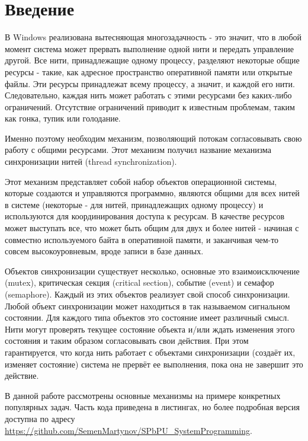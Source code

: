 \documentclass[a4paper, 12pt]{article}		%
\begin{document}
\newpage
\section*{Введение}

В Windows реализована вытесняющая многозадачность - это значит, что в любой момент система может прервать выполнение одной нити и передать управление другой. Все нити, принадлежащие одному процессу, разделяют некоторые общие ресурсы - такие, как адресное пространство оперативной памяти или открытые файлы. Эти ресурсы принадлежат всему процессу, а значит, и каждой его нити. Следовательно, каждая нить может работать с этими ресурсами без каких-либо ограничений. Отсутствие ограничений приводит к известным проблемам, таким как гонка, тупик или голодание.

Именно поэтому необходим механизм, позволяющий потокам согласовывать свою работу с общими ресурсами. Этот механизм получил название механизма синхронизации нитей (thread synchronization).

Этот механизм представляет собой набор объектов операционной системы, которые создаются и управляются программно, являются общими для всех нитей в системе (некоторые - для нитей, принадлежащих одному процессу) и используются для координирования доступа к ресурсам. В качестве ресурсов может выступать все, что может быть общим для двух и более нитей - начиная с совместно используемого байта в оперативной памяти, и заканчивая чем-то совсем высокоуровневым, вроде записи в базе данных.

Объектов синхронизации существует несколько, основные это взаимоисключение (mutex), критическая секция (critical section), событие (event) и семафор (semaphore). Каждый из этих объектов реализует свой способ синхронизации. Любой объект синхронизации может находиться в так называемом сигнальном состоянии. Для каждого типа объектов это состояние имеет различный смысл. Нити могут проверять текущее состояние объекта и/или ждать изменения этого состояния и таким образом согласовывать свои действия. При этом гарантируется, что когда нить работает с объектами синхронизации (создаёт их, изменяет состояние) система не прервёт ее выполнения, пока она не завершит это действие. 

В данной работе рассмотрены основные механизмы на примере конкретных популярных задач. Часть кода приведена в листингах, но более подробная версия доступна по адресу \\ \url{https://github.com/SemenMartynov/SPbPU_SystemProgramming}.
\end{document}
